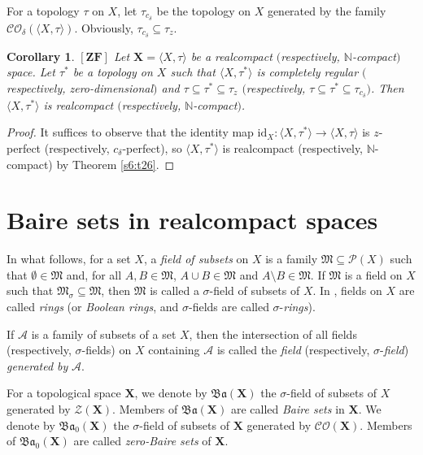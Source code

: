 \documentclass[12pt,twoside,leqno]{article}
\theoremstyle{plain}
\newtheorem{corollary}[theorem]{Corollary}
\theoremstyle{definition}
\theoremstyle{remark}
\begin{document}
For a topology $\tau$ on $X$, let $\tau_{c_{\delta}}$ be the topology on $X$ generated by the family $\mathcal{CO}_{\delta}(\langle X, \tau\rangle)$. Obviously, $\tau_{c_{\delta}}\subseteq \tau_z$.

\begin{corollary}
	\label{s6:c27}
	$[\mathbf{ZF}]$ Let $\mathbf{X}=\langle X, \tau\rangle$ be a realcompact $($respectively, $\mathbb{N}$-compact$)$ space. Let $\tau^{\ast}$ be a topology on $X$ such that $\langle X, \tau^{\ast}\rangle$ is completely regular $($respectively, zero-dimensional$)$ and $\tau\subseteq\tau^{\ast}\subseteq \tau_{z}$ $($respectively,  $\tau\subseteq\tau^{\ast}\subseteq \tau_{c_{\delta}}$$)$. Then $\langle X, \tau^{\ast}\rangle$ is realcompact $($respectively, $\mathbb{N}$-compact$)$.
\end{corollary}
\begin{proof}
	It suffices to observe that the identity map $\text{id}_{X}:\langle X, \tau^{\ast}\rangle\to\langle X, \tau\rangle$ is $z$-perfect (respectively, $c_{\delta}$-perfect), so $\langle X, \tau^{\ast}\rangle$ is realcompact (respectively, $\mathbb{N}$-compact) by Theorem \ref{s6:t26}.
\end{proof}

\section{Baire sets in realcompact spaces}
\label{s7}
In what follows, for a set $X$, a \emph{field of subsets} on $X$ is a family $\mathfrak{M}\subseteq\mathcal{P}(X)$ such that $\emptyset\in \mathfrak{M}$ and, for all $A,B\in\mathfrak{M}$, $A\cup B\in\mathfrak{M}$ and $A\setminus B\in\mathfrak{M}$. If $\mathfrak{M}$ is a field on $X$ such that $\mathfrak{M}_{\sigma}\subseteq\mathfrak{M}$, then $\mathfrak{M}$ is called a $\sigma$-field of subsets of $X$. In \cite{hal}, fields on $X$ are called \emph{rings} (or \emph{Boolean rings}, and $\sigma$-fields are called $\sigma$-\emph{rings}).

If $\mathcal{A}$ is a family of subsets of a set $X$, then the intersection of all fields (respectively, $\sigma$-fields) on $X$ containing $\mathcal{A}$ is called the \emph{field} (respectively, $\sigma$-\emph{field}) \emph{generated by} $\mathcal{A}$.

For a topological space $\mathbf{X}$, we denote by $\mathfrak{Ba}(\mathbf{X})$ the $\sigma$-field of subsets of $X$ generated by $\mathcal{Z}(\mathbf{X})$. Members of $\mathfrak{Ba}(\mathbf{X})$ are called \emph{Baire sets} in $\mathbf{X}$. We denote by $\mathfrak{Ba}_0(\mathbf{X})$ the $\sigma$-field of subsets of $\mathbf{X}$ generated by $\mathcal{CO}(\mathbf{X})$. Members of $\mathfrak{Ba}_0(\mathbf{X})$ are called \emph{zero-Baire sets} of $\mathbf{X}$.
\end{document}
